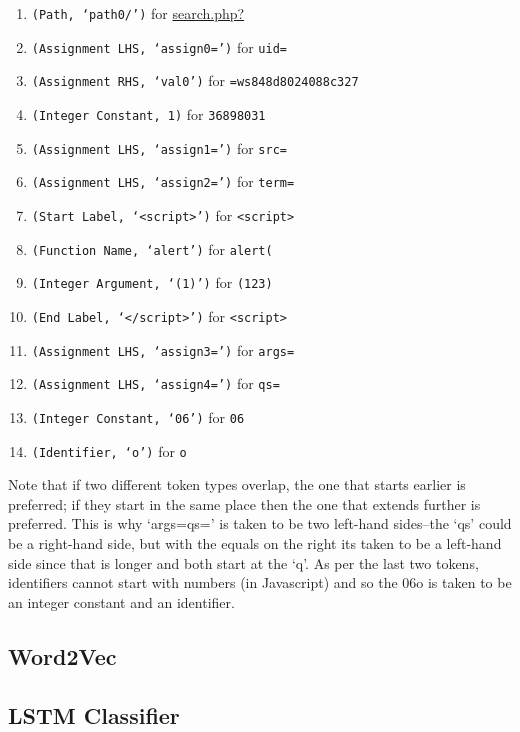 \begin{enumerate}
\item \texttt{(Path, `path0/')} for \url{search.php?}
\item \texttt{(Assignment LHS, `assign0=')} for \texttt{uid=}
\item \texttt{(Assignment RHS, `val0')} for \texttt{=ws848d8024088c327}
\item \texttt{(Integer Constant, 1)} for \texttt{36898031}
\item \texttt{(Assignment LHS, `assign1=')} for \texttt{src=}
\item \texttt{(Assignment LHS, `assign2=')} for \texttt{term=}
\item \texttt{(Start Label, `<script>')} for \texttt{<script>}
\item \texttt{(Function Name, `alert')} for \texttt{alert(}
\item \texttt{(Integer Argument, `(1)')} for \texttt{(123)}
\item \texttt{(End Label, `</script>')} for \texttt{<script>}
\item \texttt{(Assignment LHS, `assign3=')} for \texttt{args=}
\item \texttt{(Assignment LHS, `assign4=')} for \texttt{qs=}
\item \texttt{(Integer Constant, `06')} for \texttt{06}
\item \texttt{(Identifier, `o')} for \texttt{o}
\end{enumerate}

Note that if two different token types overlap, the one that starts earlier is preferred; if they start in the same place then the one that extends further is preferred. This is why `args=qs=' is taken to be two left-hand sides--the `qs' could be a right-hand side, but with the equals on the right its taken to be a left-hand side since that is longer and both start at the `q'. As per the last two tokens, identifiers cannot start with numbers  (in Javascript) and so the 06o is taken to be an integer constant and an identifier.


\subsection{Word2Vec}



\subsection{LSTM Classifier}


